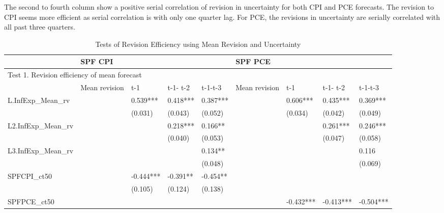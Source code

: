 \documentclass[]{article}
\begin{document}
	The second to fourth column show a positive serial correlation of revision in uncertainty for both CPI and PCE forecasts. The revision to CPI seems more efficient as serial correlation is with only one quarter lag. For PCE, the revisions in uncertainty are serially correlated with all past three quarters. 
	
		\begin{table}
			\begin{adjustbox}{width={24cm},totalheight={14cm}}
				\begin{threeparttable}
					\caption{Tests of Revision Efficiency using Mean Revision and Uncertainty}
					\label{RevEfficiency}
					\begin{tabular}{lllllllll}
						\hline 
						& \multicolumn{4}{l}{SPF CPI}                     & \multicolumn{4}{l}{SPF PCE}                       \\
						\hline 
						\multicolumn{9}{l}{Test 1.  Revision efficiency of mean forecast}            \\
						\hline 
						& Mean revision & t-1       & t-1- t-2 & t-1-t-3  & Mean revision & t-1       & t-1- t-2  & t-1-t-3   \\
						\hline 
						L.InfExp\_Mean\_rv  &               & 0.539***  & 0.418*** & 0.387*** &               & 0.606***  & 0.435***  & 0.369***  \\
						&               & (0.031)   & (0.043)  & (0.052)  &               & (0.034)   & (0.042)   & (0.049)   \\
						L2.InfExp\_Mean\_rv &               &           & 0.218*** & 0.166**  &               &           & 0.261***  & 0.246***  \\
						&               &           & (0.040)  & (0.053)  &               &           & (0.047)   & (0.058)   \\
						L3.InfExp\_Mean\_rv &               &           &          & 0.134**  &               &           &           & 0.116     \\
						&               &           &          & (0.048)  &               &           &           & (0.069)   \\
						SPFCPI\_ct50        &               & -0.444*** & -0.391** & -0.454** &               &           &           &           \\
						&               & (0.105)   & (0.124)  & (0.138)  &               &           &           &           \\
						SPFPCE\_ct50        &               &           &          &          &               & -0.432*** & -0.413*** & -0.504*** \\

\end{tabular}
\end{threeparttable}
\end{adjustbox}
\end{table}
\end{document}
